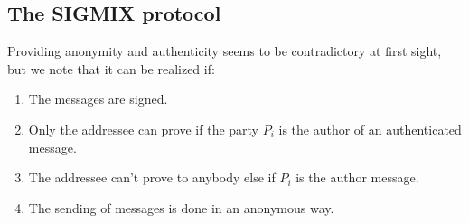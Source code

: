 \documentclass{acm_proc_article-sp}
\begin{document}
\subsection{The SIGMIX protocol}
Providing anonymity and authenticity seems to be contradictory at first sight, but we note that it can be realized if:
\begin{enumerate}
    \item The messages are signed.
    \item Only the addressee can prove if the party $P_i$  is the author of an authenticated message.
    \item The addressee can't prove to anybody else if $P_i$ is the author message.
    \item The sending of messages is done in an anonymous way.
\end{enumerate}
\end{document}
